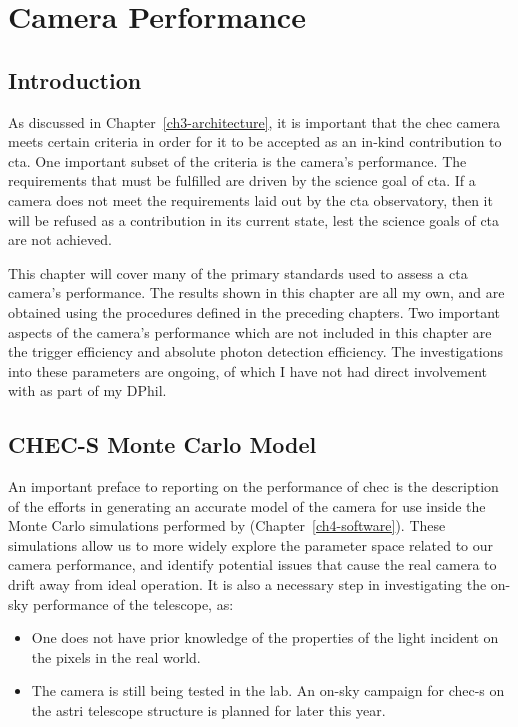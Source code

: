 \chapter{\label{ch7-performance}Camera Performance} 

\minitoc

\section{Introduction}

As discussed in Chapter~\ref{ch3-architecture}, it is important that the \gls{chec} camera meets certain criteria in order for it to be accepted as an in-kind contribution to \gls{cta}. One important subset of the criteria is the camera's performance. The requirements that must be fulfilled are driven by the science goal of \gls{cta}. If a camera does not meet the requirements laid out by the \gls{cta} observatory, then it will be refused as a contribution in its current state, lest the science goals of \gls{cta} are not achieved.

This chapter will cover many of the primary standards used to assess a \gls{cta} camera's performance. The results shown in this chapter are all my own, and are obtained using the procedures defined in the preceding chapters. Two important aspects of the camera's performance which are not included in this chapter are the trigger efficiency and absolute photon detection efficiency. The investigations into these parameters are ongoing, of which I have not had direct involvement with as part of my DPhil.

\section{CHEC-S Monte Carlo Model}

An important preface to reporting on the performance of \gls{chec} is the description of the efforts in generating an accurate model of the camera for use inside the Monte Carlo simulations performed by  (Chapter~\ref{ch4-software}). These simulations allow us to more widely explore the parameter space related to our camera performance, and identify potential issues that cause the real camera to drift away from ideal operation. It is also a necessary step in investigating the on-sky performance of the telescope, as:

\begin{itemize}
\item One does not have prior knowledge of the properties of the light incident on the pixels in the real world.
\item The camera is still being tested in the lab. An on-sky campaign for \gls{chec-s} on the \gls{astri} telescope structure is planned for later this year.
\end{itemize}


